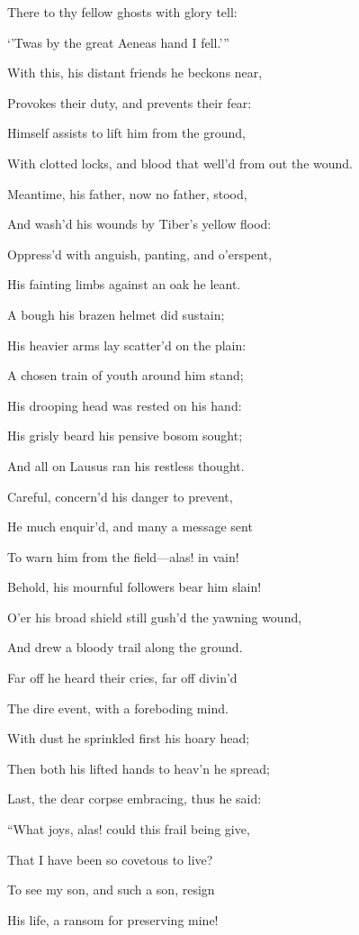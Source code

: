 There to thy fellow ghosts with glory tell:

‘’Twas by the great Aeneas hand I fell.’”

With this, his distant friends he beckons near,

Provokes their duty, and prevents their fear:

Himself assists to lift him from the ground,

With clotted locks, and blood that well’d from out the wound.

Meantime, his father, now no father, stood,

And wash’d his wounds by Tiber’s yellow flood:

Oppress’d with anguish, panting, and o’erspent,

His fainting limbs against an oak he leant.

A bough his brazen helmet did sustain;

His heavier arms lay scatter’d on the plain:

A chosen train of youth around him stand;

His drooping head was rested on his hand:

His grisly beard his pensive bosom sought;

And all on Lausus ran his restless thought.

Careful, concern’d his danger to prevent,

He much enquir’d, and many a message sent

To warn him from the field—alas! in vain!

Behold, his mournful followers bear him slain!

O’er his broad shield still gush’d the yawning wound,

And drew a bloody trail along the ground.

Far off he heard their cries, far off divin’d

The dire event, with a foreboding mind.

With dust he sprinkled first his hoary head;

Then both his lifted hands to heav’n he spread;

Last, the dear corpse embracing, thus he said:

“What joys, alas! could this frail being give,

That I have been so covetous to live?

To see my son, and such a son, resign

His life, a ransom for preserving mine!

